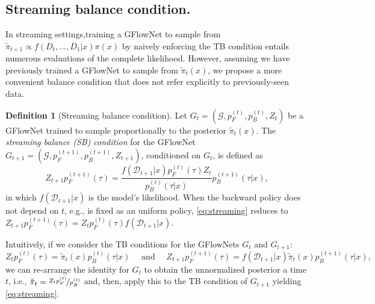 \documentclass{article}
\theoremstyle{plain}
\theoremstyle{definition}
\newtheorem{definition}{Definition}
\theoremstyle{remark}
\theoremstyle{remark}
\begin{document}
\subsection{Streaming balance condition.}
\label{subsec:stb}
In streaming settings,training a GFlowNet to sample from $\tilde{\pi}_{t+1} \propto f(D_t,\ldots,D_1|x)\pi(x)$  by naively enforcing the TB condition entails numerous evaluations of the complete likelihood. However, assuming we have previously trained a GFlowNet to sample from $\tilde{\pi}_t(x)$, we propose a more convenient balance condition that does not refer explicitly to previously-seen data.

\begin{definition}[Streaming balance condition] \label{def:sb}
    Let $G_{t} = (\mathcal{G}, p_{F}^{(t)}, p_{B}^{(t)}, Z_{t})$ be a GFlowNet trained to sample proportionally to the posterior $\tilde{\pi}_{t}(x)$. The \textit{streaming balance (SB) condition} for the GFlowNet $G_{t + 1} = (\mathcal{G}, p_{F}^{(t + 1)}, p_{B}^{(t + 1)}, Z_{t + 1})$, conditioned on $G_{t}$, is defined as 
    \begin{equation} \label{eq:streaming} 
        Z_{t + 1} p_{F}^{(t + 1)}(\tau) = \frac{f(\mathcal{D}_{t + 1} | x) p_{F}^{(t)}(\tau) Z_{t}}{p_{B}^{(t)}(\tau | x)} p_{B}^{(t + 1)}(\tau | x),
    \end{equation}
    in which $f(\mathcal{D}_{t + 1} | x)$ is the model's likelihood. When the backward policy does not depend on $t$, e.g., is fixed as an uniform policy, \autoref{eq:streaming} reduces to $Z_{t + 1} p_{F}^{(t + 1)}(\tau) = Z_{t} p_{F}^{(t)}(\tau) f(\mathcal{D}_{t + 1} | x)$.   
\end{definition}

Intuitively, if we consider the TB conditions for the GFlowNets $G_t$ and $G_{t+1}$:
\begin{equation*}
Z_{t} p_{F}^{(t)}(\tau)  = \tilde{\pi}_{t}(x) p_{B}^{(t)}(\tau | x) \quad \text{ and } \quad Z_{t + 1} p_{F}^{(t+1)}(\tau) = f(\mathcal{D}_{t + 1} | x) \tilde{\pi}_{t}(x) p_{B}^{(t + 1)}(\tau | x),
\end{equation*}
we can re-arrange the identity for $G_t$ to obtain the unnormalized posterior a time $t$, i.e., $\tilde{\pi}_t = \nicefrac{Z_{t} p_{F}^{(t)}}{p_{B}^{(t)}}$ and, then, apply this to the TB condition of $G_{t+1}$ yielding \autoref{eq:streaming}. 
\end{document}
